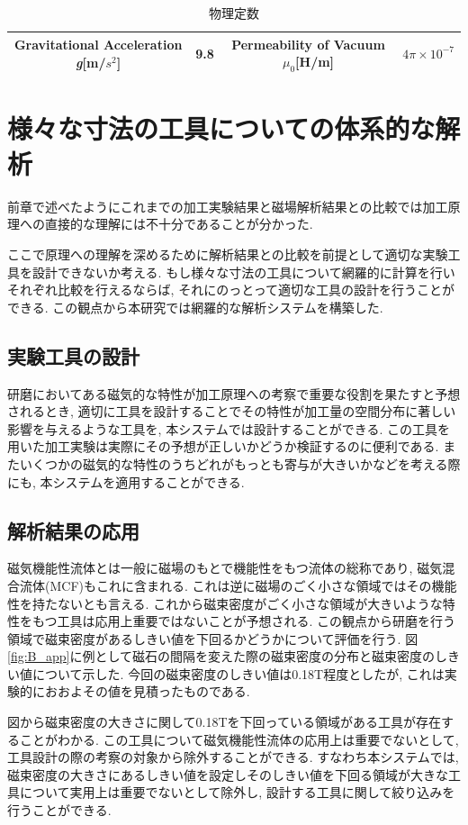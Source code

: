 \documentclass[11pt]{jarticle}
\begin{document}
  \begin{table}[H]
    \begin{tabular}{|c|c||c|c|} \hline
      Gravitational Acceleration {\it g}[m/$s^2$] & 9.8 & Permeability of Vacuum $\mu_0$[H/m] & $4\pi\times10^{-7}$ \\ \hline
    \end{tabular}
    \centering
    \caption{物理定数}
    \label{tab:physical_constant}
  \end{table}

\newpage

\section{様々な寸法の工具についての体系的な解析}
前章で述べたようにこれまでの加工実験結果と磁場解析結果との比較では加工原理への直接的な理解には不十分であることが分かった. \par
ここで原理への理解を深めるために解析結果との比較を前提として適切な実験工具を設計できないか考える. もし様々な寸法の工具について網羅的に計算を行いそれぞれ比較を行えるならば, それにのっとって適切な工具の設計を行うことができる. この観点から本研究では網羅的な解析システムを構築した. 

  \subsection{実験工具の設計}
研磨においてある磁気的な特性が加工原理への考察で重要な役割を果たすと予想されるとき, 適切に工具を設計することでその特性が加工量の空間分布に著しい影響を与えるような工具を, 本システムでは設計することができる. この工具を用いた加工実験は実際にその予想が正しいかどうか検証するのに便利である. またいくつかの磁気的な特性のうちどれがもっとも寄与が大きいかなどを考える際にも, 本システムを適用することができる. 

  \subsection{解析結果の応用}
磁気機能性流体とは一般に磁場のもとで機能性をもつ流体の総称であり, 磁気混合流体(MCF)もこれに含まれる. これは逆に磁場のごく小さな領域ではその機能性を持たないとも言える. これから磁束密度がごく小さな領域が大きいような特性をもつ工具は応用上重要ではないことが予想される. この観点から研磨を行う領域で磁束密度があるしきい値を下回るかどうかについて評価を行う. 図\ref{fig:B_app}に例として磁石の間隔を変えた際の磁束密度の分布と磁束密度のしきい値について示した. 今回の磁束密度のしきい値は0.18T程度としたが, これは実験的におおよその値を見積ったものである. \cite{塚田}\par
図から磁束密度の大きさに関して0.18Tを下回っている領域がある工具が存在することがわかる. この工具について磁気機能性流体の応用上は重要でないとして, 工具設計の際の考察の対象から除外することができる. すなわち本システムでは, 磁束密度の大きさにあるしきい値を設定しそのしきい値を下回る領域が大きな工具について実用上は重要でないとして除外し, 設計する工具に関して絞り込みを行うことができる. 
\end{document}
